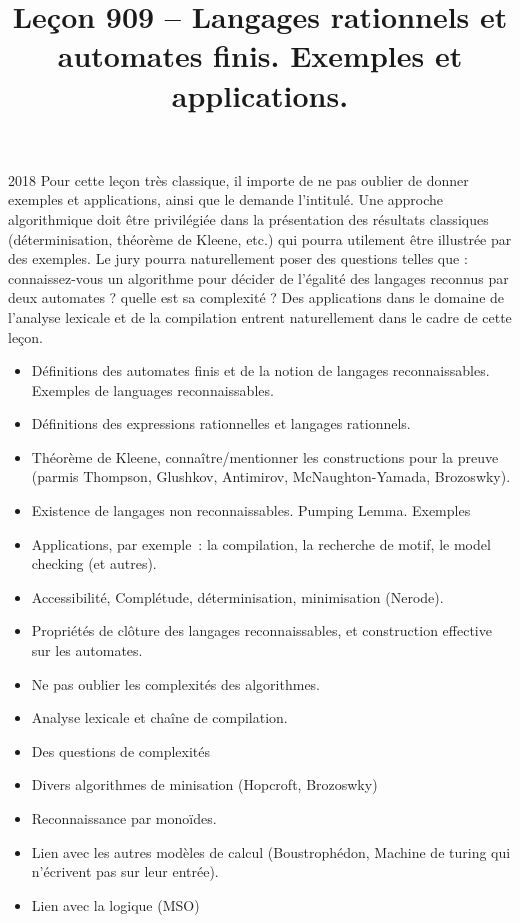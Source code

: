 \documentclass{agregfiche}
\title{Leçon 909 -- Langages rationnels et automates finis.  Exemples et applications.}
\begin{document}
\maketitle

\secrapports

\begin{rapport}{2018}
Pour cette leçon très classique, il importe de ne pas oublier de donner exemples et applications, ainsi
que le demande l’intitulé.
Une approche algorithmique doit être privilégiée dans la présentation des résultats classiques (déterminisation, théorème de
Kleene, etc.) qui pourra utilement être illustrée par des exemples. Le jury pourra naturellement poser des questions telles que : connaissez-vous un algorithme pour décider de l’égalité des langages reconnus par deux automates ? quelle est sa complexité ?
Des applications dans le domaine de l’analyse lexicale et de la compilation entrent naturellement dans
le cadre de cette leçon.
\end{rapport}

\secindispensables

\begin{itemize}
\item  Définitions des automates finis et de la notion de langages reconnaissables. Exemples de languages reconnaissables.
\item Définitions des expressions rationnelles et langages rationnels.
\item Théorème de Kleene, connaître/mentionner les constructions pour la preuve (parmis Thompson, Glushkov, Antimirov, McNaughton-Yamada, Brozoswky).
\end{itemize}

\secasavoir

\begin{itemize}
	\item Existence de langages non reconnaissables. Pumping Lemma. Exemples
	\item Applications, par exemple~: la compilation, la recherche de motif, le
	model checking (et autres).
	\item Accessibilité, Complétude, déterminisation, minimisation (Nerode).
	\item Propriétés de clôture des langages reconnaissables, et construction
	effective sur les automates.
	\item Ne pas oublier les complexités des algorithmes.
\end{itemize}


\secidees
\begin{itemize}
	\item Analyse lexicale et chaîne de compilation.
	\item Des questions de complexités
	\item Divers algorithmes de minisation (Hopcroft, Brozoswky)
	\item Reconnaissance par monoïdes.
	\item Lien avec les autres modèles de calcul (Boustrophédon, Machine de turing
	qui n'écrivent pas sur leur entrée).
	\item Lien avec la logique (MSO)
\end{itemize}
\end{document}
